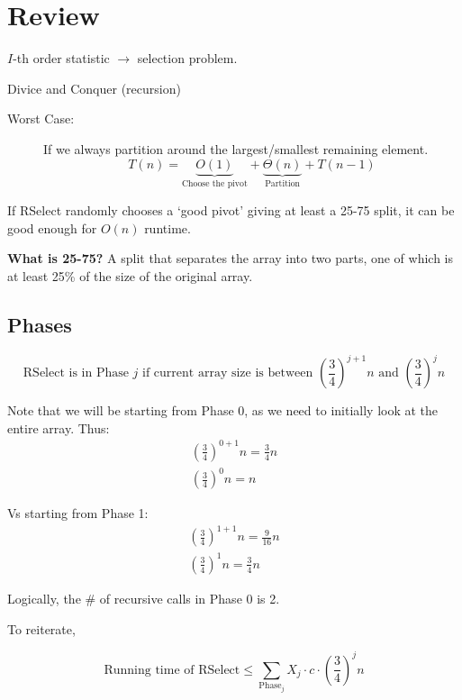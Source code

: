 \documentclass{article}
\newcommand{\runtimeselect}{\sum_{\text{Phase}_j}X_j \cdot c \cdot \left( \frac{3}{4} \right) ^ j n}
\begin{document}
\section*{Review}
$I$-th order statistic $\rightarrow$ selection problem.

Divice and Conquer (recursion)

\begin{description}
    \item[Worst Case:]  If we always partition around the largest/smallest remaining element.
        \begin{equation*}
            T(n) = \underbrace{O(1)}_{\text{Choose the pivot}} + \underbrace{\Theta(n)}_{\text{Partition}} + T(n-1)
        \end{equation*}
\end{description}

If RSelect randomly chooses a `good pivot' giving at least a 25-75 split, it can be good enough for \(O(n)\) runtime.

\textbf{What is 25-75?} A split that separates the array into two parts, one of which is at least 25\% of the size of the original array.

\subsection*{Phases}
\begin{equation*}
    \text{RSelect is in Phase } j \text{ if current array size is between } \left( \frac{3}{4} \right) ^ {j+1} n \text{ and } \left( \frac{3}{4} \right) ^ j n
\end{equation*}

Note that we will be starting from Phase 0, as we need to initially look at the entire array.
Thus:
\begin{align*}
    \left( \frac{3}{4} \right) ^ {0+1} n = \frac{3}{4}n \\
    \left( \frac{3}{4} \right) ^ {0} n = n
\end{align*}

Vs starting from Phase 1:
\begin{align*}
    \left( \frac{3}{4} \right) ^ {1+1} n = \frac{9}{16}n \\
    \left( \frac{3}{4} \right) ^ {1} n = \frac{3}{4}n
\end{align*}

Logically, the \# of recursive calls in Phase 0 is 2.

To reiterate,

\begin{equation*}
    \text{Running time of RSelect} \leq \runtimeselect
\end{equation*}
\end{document}
